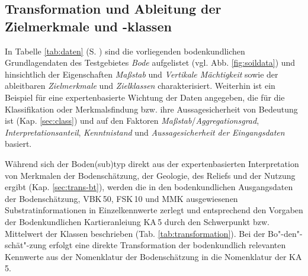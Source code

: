\subsection{Transformation und Ableitung der Zielmerkmale und -klassen}\label{sec:transformation}
In Tabelle \ref{tab:daten} (S. \pageref{tab:daten}) sind die vorliegenden bodenkundlichen Grundlagendaten des Testgebietes \textit{Bode} aufgelistet (vgl. Abb. \ref{fig:soildata}) und hinsichtlich der Eigenschaften \textit{Maßstab} und \textit{Vertikale Mächtigkeit} sowie der ableitbaren \textit{Zielmerkmale} und \textit{Zielklassen} charakterisiert. Weiterhin ist ein Beispiel für eine expertenbasierte Wichtung der Daten angegeben, die für die
 Klassifikation oder Merkmalsfindung bzw. ihre Aussagesicherheit von Bedeutung ist (Kap. \ref{sec:class}) und auf den Faktoren \textit{Maßstab}/\textit{Aggregationsgrad}, \textit{Interpretationsanteil}, \textit{Kenntnistand} und \textit{Aussagesicherheit der Eingangsdaten} basiert.\

Während sich der Boden(sub)typ direkt aus der expertenbasierten Interpretation von Merkmalen der Bodenschätzung, der Geologie, des Reliefs und der Nutzung ergibt (Kap. \ref{sec:trans-bt}), werden die in den bodenkundlichen Ausgangsdaten der Bodenschätzung, VBK\,50, FSK\,10 und MMK ausgewiesenen Substratinformationen in Einzelkennwerte zerlegt und entsprechend den Vorgaben der Bodenkundlichen Kartieranleiung KA\,5 \citep{KA5} durch den Schwerpunkt bzw. Mittelwert der Klassen beschrieben (Tab. \ref{tab:transformation}). Bei der Bo"-den"-schät"-zung erfolgt eine direkte Transformation der bodenkundlich relevanten Kennwerte aus der Nomenklatur der Bodenschätzung in die Nomenklatur der KA\,5.

